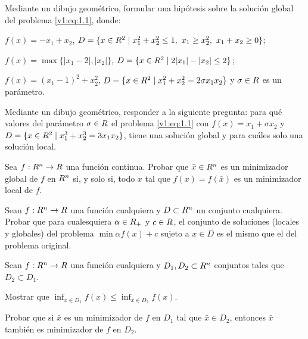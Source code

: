 


\begin{exercise}\label{v1:ejer:1.1}
 Mediante un dibujo geométrico, formular una hipótesis sobre la solución global del problema \eqref{v1:eq:1.1}, donde:
 \begin{enuthm}
 \item $f(x) = -x_1 + x_2$, $D = \{x \in \R^2 \mid x_1^2 + x_2^2 \le 1,\ x_1 \ge x_2^2,\ x_1 + x_2 \ge 0\}$;
 \item $f(x) = \max\{|x_1 - 2|, |x_2|\}$, $D = \{x \in R^2 \mid 2|x_1| - |x_2| \le 2\}$;
 \item $f(x) = (x_1 - 1)^2 + x_2^2$, $D = \{x \in R^2 \mid x_1^2 + x_2^2 = 2\sigma x_1 x_2\}$ y $\sigma \in R$ es un parámetro.
 \end{enuthm}
\end{exercise}

\begin{exercise}\label{v1:ejer:1.2}
 Mediante un dibujo geométrico, responder a la siguiente pregunta: para qué valores del parámetro $\sigma \in R$ el problema \eqref{v1:eq:1.1} con $f(x) = x_1 + \sigma x_2$ y $D = \{x \in R^2 \mid x_1^3 + x_2^3 = 3x_1x_2\}$, tiene una solución global y para cuáles solo una solución local.
\end{exercise}

\begin{exercise}\label{v1:ejer:1.3}
 Sea $f : R^n \to R$ una función continua. Probar que $\bar{x} \in R^n$ es un minimizador global de $f$ en $R^n$ si, y solo si, todo $x$ tal que $f(x) = f(\bar{x})$ es un minimizador local de $f$.
\end{exercise}

\begin{exercise}\label{v1:ejer:1.4}
 Sean $f : R^n \to R$ una función cualquiera y $D \subset R^n$ un conjunto cualquiera. Probar que para cualesquiera $\alpha \in R_+$ y $c \in R$, el conjunto de soluciones (locales y globales) del problema $\min \alpha f(x) + c$ sujeto a $x \in D$ es el mismo que el del problema original.
\end{exercise}

\begin{exercise}\label{v1:ejer:1.5}
 Sean $f : R^n \to R$ una función cualquiera y $D_1, D_2 \subset R^n$ conjuntos tales que $D_2 \subset D_1$.
 \begin{enuthm}
 \item Mostrar que $\inf_{x \in D_1} f(x) \le \inf_{x \in D_2} f(x)$.
 \item Probar que si $\bar{x}$ es un minimizador de $f$ en $D_1$ tal que $\bar{x} \in D_2$, entonces $\bar{x}$ también es minimizador de $f$ en $D_2$.
 \end{enuthm}
\end{exercise}

